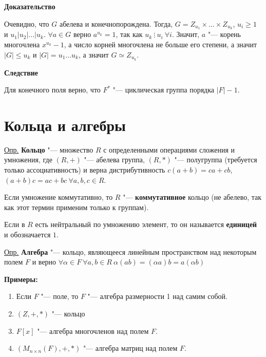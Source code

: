 \documentclass{article}
\begin{document}
\vspace{5pt}

\textbf{Доказательство}

Очевидно, что $G$ абелева и конечнопорождена. Тогда, $G = Z_{u_1} \times ... \times Z_{u_k}$, $u_i \geq 1$ и $u_1 | u_2 | ... | u_k$. $\forall a \in G$ верно $a^{u_k} = 1$, так как $u_k \ \vdots \ u_i \ \forall i$. Значит, $a$ "--- корень многочлена $x^{u_k} - 1$, а число корней многочлена не больше его степени, а значит $|G| \leq u_k$ и $|G| = u_1...u_k$, а значит $G \simeq Z_{u_k}$.

\vspace{5pt}

\textbf{Следствие}

Для конечного поля верно, что $F^*$ "--- циклическая группа порядка $|F| - 1$.

\section{Кольца и алгебры} 

\underline{Опр.} \textbf{Кольцо} "--- множество $R$ с определенными операциями сложения и умножения, где $(R, +)$ "--- абелева группа, $(R, *)$ "--- полугруппа (требуется только ассоциативность) и верна дистрибутивность $c(a + b) = ca + cb$, $(a + b)c = ac + bc \ \forall a, b, c \in R$.

Если умножение коммутативно, то $R$ "--- \textbf{коммутативное} кольцо (не абелево, так как этот термин применим только к группам).

Если в $R$ есть нейтральный по умножению элемент, то он называется \textbf{единицей} и обозначается $1$.

\vspace{5pt}

\underline{Опр.} \textbf{Алгебра} "--- кольцо, являющееся линейным пространством над некоторым полем $F$ и верно $\forall \alpha \in F \ \forall a, b \in R \ \alpha(ab) = (\alpha a)b = a(\alpha b)$

\vspace{10pt}

\textbf{Примеры:}
\begin{enumerate}
	\item Если $F$ "--- поле, то $F$ "--- алгебра размерности 1 над самим собой.
	\item $(Z, +, *)$ "--- кольцо
	\item $F[x]$ "--- алгебра многочленов над полем $F$.
	\item $(M_{n \times n}(F), +, *)$ "--- алгебра матриц над полем $F$.
\end{enumerate}
\end{document}
